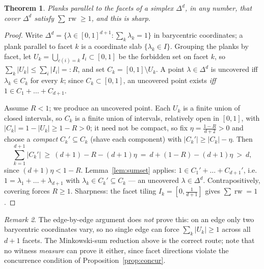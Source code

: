 \documentclass{aims}
\numberwithin{equation}{section}
\theoremstyle{plain}
\newtheorem{theorem}{Theorem}[section]
\theoremstyle{definition}
\theoremstyle{remark}
\newtheorem{remark}[theorem]{Remark}
\newcommand{\rw}{\operatorname{rw}}
\begin{document}
\begin{theorem}\label{thm:facet}
Planks parallel to the facets of a simplex $\Delta^d$, in any number, that cover
$\Delta^d$ satisfy $\sum\rw\ge1$, and this is sharp.
\end{theorem}
\begin{proof}
Write $\Delta^d=\{\lambda\in[0,1]^{d+1}:\sum_k\lambda_k=1\}$ in barycentric
coordinates; a plank parallel to facet $k$ is a coordinate slab
$\{\lambda_k\in I\}$. Grouping the planks by facet, let
$U_k=\bigcup_{c(i)=k}I_i\subset[0,1]$ be the forbidden set on facet $k$, so
$\sum_k|U_k|\le\sum_i|I_i|=:R$, and set $C_k=[0,1]\setminus U_k$. A point
$\lambda\in\Delta^d$ is uncovered iff $\lambda_k\in C_k$ for every $k$; since
$C_k\subset[0,1]$, an uncovered point exists \emph{iff}
$1\in C_1+\dots+C_{d+1}$.

Assume $R<1$; we produce an uncovered point. Each $U_k$ is a finite union of
closed intervals, so $C_k$ is a finite union of intervals, relatively open in
$[0,1]$, with $|C_k|=1-|U_k|\ge1-R>0$; it need not be compact, so fix
$\eta=\tfrac{1-R}{d+2}>0$ and choose a \emph{compact} $C_k'\subseteq C_k$ (shave
each component) with $|C_k'|\ge|C_k|-\eta$. Then
\[
\textstyle\sum_{k=1}^{d+1}|C_k'|\ \ge\ (d+1)-R-(d+1)\eta\ =\ d+(1-R)-(d+1)\eta
\ >\ d,
\]
since $(d+1)\eta<1-R$. Lemma~\ref{lem:sumset} applies: $1\in C_1'+\dots+C_{d+1}'$,
i.e.\ $1=\lambda_1+\dots+\lambda_{d+1}$ with
$\lambda_k\in C_k'\subseteq C_k$ --- an uncovered $\lambda\in\Delta^d$.
Contrapositively, covering forces $R\ge1$. Sharpness: the facet tiling
$I_k=[0,\tfrac1{d+1}]$ gives $\sum\rw=1$.
\end{proof}
\begin{remark}
The edge-by-edge argument does \emph{not} prove this: on an edge only two
barycentric coordinates vary, so no single edge can force $\sum_k|U_k|\ge1$ across
all $d+1$ facets. The Minkowski-sum reduction above is the correct route; note that
no witness \emph{measure} can prove it either, since facet directions violate the
concurrence condition of Proposition~\ref{prop:concur}.
\end{remark}
\end{document}

